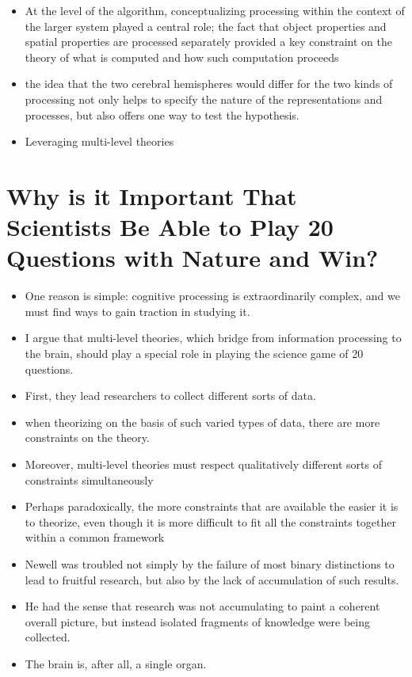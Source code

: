 \documentclass[12pt]{article}
\begin{document}
\begin{itemize}
\item At the level of the algorithm, conceptualizing processing within the context of the larger system played a central role; the fact that object properties and spatial properties are processed separately provided a key constraint on the theory of what is computed and how such computation proceeds
\item the idea that the two cerebral hemispheres would differ for the two kinds of processing not only helps to specify the nature of the representations and processes, but also offers one way to test the hypothesis.
\item Leveraging multi-level theories
\end{itemize}

\section{Why is it Important That Scientists Be Able to Play 20 Questions with Nature and Win?}

\begin{itemize}

\item One reason is simple: cognitive processing is extraordinarily complex, and we must find ways to gain traction in studying it.
\item I argue that multi-level theories, which bridge from information processing to the brain, should play a special role in playing the science game of 20 questions.
\item First, they lead researchers to collect different sorts of data.
\item when theorizing on the basis of such varied types of data, there are more constraints on the theory.
\item Moreover, multi-level theories must respect qualitatively different sorts of constraints simultaneously
\item Perhaps paradoxically, the more constraints that are available the easier it is to theorize, even though it is more difficult to fit all the constraints together within a common framework
\item Newell was troubled not simply by the failure of most binary distinctions to lead to fruitful research, but also by the lack of accumulation of such results.
\item He had the sense that research was not accumulating to paint a coherent overall picture, but instead isolated fragments of knowledge were being collected.
\item The brain is, after all, a single organ.
\end{itemize}
\end{document}
